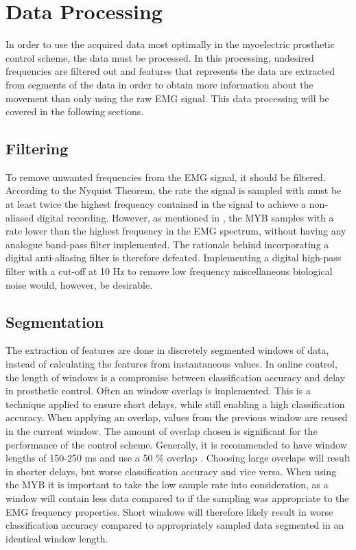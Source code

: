 \section{Data Processing} \label{sec:BG:dataProcessing}
In order to use the acquired data most optimally in the myoelectric prosthetic control scheme, the data must be processed. In this processing, undesired frequencies are filtered out and features that represents the data are extracted from segments of the data in order to obtain more information about the movement than only using the raw EMG signal. This data processing will be covered in the following sections. 

\subsection{Filtering}
To remove unwanted frequencies from the EMG signal, it should be filtered. According to the Nyquist Theorem, the rate the signal is sampled with must be at least twice the highest frequency contained in the signal to achieve a non-aliased digital recording. However, as mentioned in , the MYB samples with a rate lower than the highest frequency in the EMG spectrum, without having any analogue band-pass filter implemented. The rationale behind incorporating a digital anti-aliasing filter is therefore defeated. Implementing a digital high-pass filter with a cut-off at 10 Hz to remove low frequency miscellaneous biological noise would, however, be desirable. \cite{Cram2012} 

\subsection{Segmentation}
The extraction of features are done in discretely segmented windows of data, instead of calculating the features from instantaneous values. In online control, the length of windows is a compromise between classification accuracy and delay in prosthetic control. Often an window overlap is implemented. This is a technique applied to ensure short delays, while still enabling a high classification accuracy. When applying an overlap, values from the previous window are reused in the current window. The amount of overlap chosen is significant for the performance of the control scheme.  Generally, it is recommended to have window lengths of 150-250 ms and use a 50 $\percent$ overlap \cite{Menon2017}. Choosing large overlaps will result in shorter delays, but worse classification accuracy and vice versa. When using the MYB it is important to take the low sample rate into consideration, as a window will contain less data compared to if the sampling was appropriate to the EMG frequency properties. \cite{Menon2017} Short windows will therefore likely result in worse classification accuracy compared to appropriately sampled data segmented in an identical window length.



